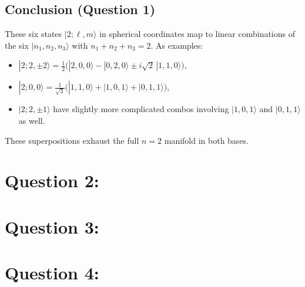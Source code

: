 \documentclass[12pt]{article}
\begin{document}
\subsection*{Conclusion (Question 1)}
These six states $|2;\ell,m\rangle$ in spherical coordinates map to linear combinations of the six $|n_1,n_2,n_3\rangle$ with $n_1+n_2+n_3=2$. As examples:
\begin{itemize}
\item $|2;2,\pm2\rangle = \tfrac{1}{2}\bigl(|2,0,0\rangle - |0,2,0\rangle \pm i\sqrt{2}\,|1,1,0\rangle\bigr)$,
\item $|2;0,0\rangle = \tfrac{1}{\sqrt{3}}\bigl(|1,1,0\rangle + |1,0,1\rangle + |0,1,1\rangle\bigr)$,
\item $|2;2,\pm1\rangle$ have slightly more complicated combos involving $|1,0,1\rangle$ and $|0,1,1\rangle$ as well.
\end{itemize}
These superpositions exhaust the full $n=2$ manifold in both bases.





\section*{Question 2:}


\section*{Question 3:}


\section*{Question 4:}
\end{document}
